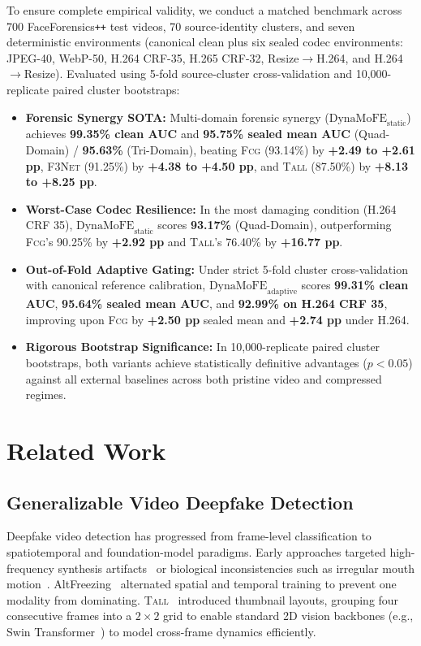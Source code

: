 \documentclass[conference]{IEEEtran}
\newcommand{\tall}{\textsc{Tall}}
\newcommand{\fcg}{\textsc{Fcg}}
\newcommand{\fthreenet}{\textsc{F3Net}}
\newcommand{\ffpp}{FaceForensics\texttt{++}}
\newcommand{\auc}{AUC}
\newcommand{\pp}{pp}
\begin{document}
To ensure complete empirical validity, we conduct a matched benchmark across 700 \ffpp{} test videos, 70 source-identity clusters, and seven deterministic environments (canonical clean plus six sealed codec environments: JPEG-40, WebP-50, H.264 CRF-35, H.265 CRF-32, Resize$\rightarrow$H.264, and H.264$\rightarrow$Resize). Evaluated using 5-fold source-cluster cross-validation and 10,000-replicate paired cluster bootstraps:
\begin{itemize}
    \item \textbf{Forensic Synergy SOTA:} Multi-domain forensic synergy ($\text{DynaMoFE}_{\text{static}}$) achieves \textbf{99.35\% clean \auc{}} and \textbf{95.75\% sealed mean \auc{}} (Quad-Domain) / \textbf{95.63\%} (Tri-Domain), beating \fcg{} (93.14\%) by \textbf{+2.49 to +2.61 \pp{}}, \fthreenet{} (91.25\%) by \textbf{+4.38 to +4.50 \pp{}}, and \tall{} (87.50\%) by \textbf{+8.13 to +8.25 \pp{}}.
    \item \textbf{Worst-Case Codec Resilience:} In the most damaging condition (H.264 CRF 35), $\text{DynaMoFE}_{\text{static}}$ scores \textbf{93.17\%} (Quad-Domain), outperforming \fcg{}'s 90.25\% by \textbf{+2.92 \pp{}} and \tall{}'s 76.40\% by \textbf{+16.77 \pp{}}.
    \item \textbf{Out-of-Fold Adaptive Gating:} Under strict 5-fold cluster cross-validation with canonical reference calibration, $\text{DynaMoFE}_{\text{adaptive}}$ scores \textbf{99.31\% clean \auc{}}, \textbf{95.64\% sealed mean \auc{}}, and \textbf{92.99\% on H.264 CRF 35}, improving upon \fcg{} by \textbf{+2.50 \pp{}} sealed mean and \textbf{+2.74 \pp{}} under H.264.
    \item \textbf{Rigorous Bootstrap Significance:} In 10,000-replicate paired cluster bootstraps, both variants achieve statistically definitive advantages ($p < 0.05$) against all external baselines across both pristine video and compressed regimes.
\end{itemize}

\section{Related Work}

\subsection{Generalizable Video Deepfake Detection}
Deepfake video detection has progressed from frame-level classification to spatiotemporal and foundation-model paradigms. Early approaches targeted high-frequency synthesis artifacts~\cite{luo2021highfrequency} or biological inconsistencies such as irregular mouth motion~\cite{haliassos2021lipforensics}. AltFreezing~\cite{wang2023altfreezing} alternated spatial and temporal training to prevent one modality from dominating. \tall{}~\cite{xu2023tall} introduced thumbnail layouts, grouping four consecutive frames into a $2\times2$ grid to enable standard 2D vision backbones (e.g., Swin Transformer~\cite{liu2021swin}) to model cross-frame dynamics efficiently.
\end{document}
